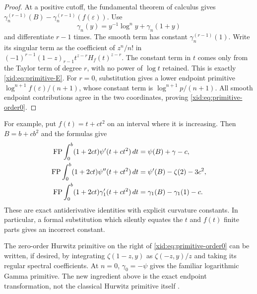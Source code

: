 \begin{proof}
At a positive cutoff, the fundamental theorem of calculus gives
$\gamma_n^{(r-1)}(B)-\gamma_n^{(r-1)}(f(\varepsilon))$.
Use
\[
 \gamma_n(y)=y^{-1}\log^n y+\gamma_n(1+y)
\]
and differentiate $r-1$ times.  The smooth term has constant
$\gamma_n^{(r-1)}(1)$.  Write its singular term as the coefficient
of $z^n/n!$ in
$(-1)^{r-1}(1-z)_{r-1}t^{z-r}H_f(t)^{z-r}$.
The constant term in $t$ comes only from the Taylor term of degree
$r$, with no power of $\log t$ retained.  This is exactly
\eqref{xid:eq:primitive-E}.  For $r=0$, substitution gives a lower
endpoint primitive $\log^{n+1}f(\varepsilon)/(n+1)$, whose constant
term is $\log^{n+1}p/(n+1)$.  All smooth endpoint contributions agree
in the two coordinates, proving \eqref{xid:eq:primitive-order0}.
\end{proof}

For example, put $f(t)=t+c t^2$ on an interval where it is increasing.
Then $B=b+cb^2$ and the formulas give
\begin{align}
 \operatorname{FP}\int_0^b(1+2ct)\psi'(t+ct^2)\,dt
    &=\psi(B)+\gamma-c,\label{xid:eq:psi-prime-curvature}\\
 \operatorname{FP}\int_0^b(1+2ct)\psi''(t+ct^2)\,dt
    &=\psi'(B)-\zeta(2)-3c^2,\label{xid:eq:psi-double-curvature}\\
 \operatorname{FP}\int_0^b(1+2ct)\gamma_1'(t+ct^2)\,dt
    &=\gamma_1(B)-\gamma_1(1)-c.\label{xid:eq:gamma1-curvature}
\end{align}
These are exact antiderivative identities with explicit curvature
constants.  In particular, a formal substitution which silently
equates the $t$ and $f(t)$ finite parts gives an incorrect constant.

The zero-order Hurwitz primitive on the right of
\eqref{xid:eq:primitive-order0} can be written, if desired, by integrating
$\zeta(1-z,y)$ as $\zeta(-z,y)/z$ and taking its regular spectral
coefficients.  At $n=0$, $\gamma_0=-\psi$ gives the familiar
logarithmic Gamma primitive.  The new ingredient above is the exact
endpoint transformation, not the classical Hurwitz primitive itself
\cite{EspinosaMoll2}.
